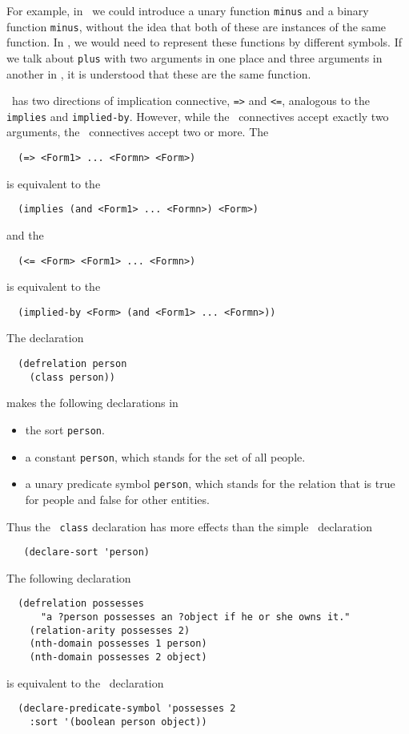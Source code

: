 For example, in \snark\  we could introduce a unary function \verb'minus' and
a binary function \verb'minus', without the idea that both of these are
instances of the same function.  In \kif\/, we would need to represent these
functions by different symbols.  If we talk about \verb'plus' with two
arguments in one place and three arguments in another in \kif\/, it is
understood that these are the same function.

 \Kif\  has two directions of implication connective, \verb'=>' and \verb'<=',
analogous to the \snark\/ \verb'implies' and \verb'implied-by'.  However,
while the \snark\  connectives accept exactly two arguments, the \kif\
connectives accept two or more.  The \kif\
\begin{verbatim}
  (=> <Form1> ... <Formn> <Form>)
\end{verbatim}
is equivalent to the \snark\
\begin{verbatim}
  (implies (and <Form1> ... <Formn>) <Form>)
\end{verbatim}
and the \kif\
\begin{verbatim}
  (<= <Form> <Form1> ... <Formn>)
\end{verbatim}
is equivalent to the \snark\
\begin{verbatim}
  (implied-by <Form> (and <Form1> ... <Formn>))
\end{verbatim}

The declaration
\begin{verbatim}
  (defrelation person
    (class person))
\end{verbatim}
makes the following declarations in \snark
\begin{itemize}
 \item the sort {\tt person}.

 \item a constant {\tt person}, which stands
 for the set of all people.

 \item a unary predicate symbol \verb'person', which stands for the relation
 that is true for people and false for other entities.
\end{itemize}
Thus the \kif\  \verb'class' declaration has more effects than the simple
 \snark\  declaration
\begin{verbatim}
   (declare-sort 'person)
\end{verbatim}

The following declaration
\begin{verbatim}
  (defrelation possesses
      "a ?person possesses an ?object if he or she owns it."
    (relation-arity possesses 2)
    (nth-domain possesses 1 person)
    (nth-domain possesses 2 object)
\end{verbatim}
is equivalent to the \snark\  declaration
\begin{verbatim}
  (declare-predicate-symbol 'possesses 2
    :sort '(boolean person object))
\end{verbatim}

